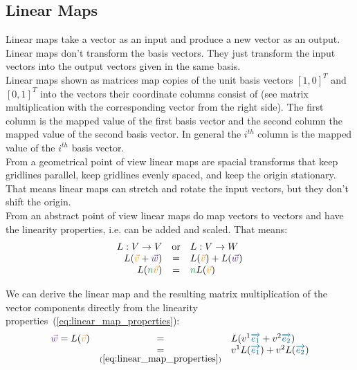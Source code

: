 \subsection{Linear Maps}

Linear maps take a vector as an input and produce a new vector as an output. Linear maps
don't transform the basis vectors. They just transform the input vectors into the output
vectors given in the same basis.\\

Linear maps shown as matrices map copies of the unit basis vectors $[1,0]^T$ and $[0,1]^T$
into the vectors their coordinate columns consist of (see matrix multiplication with the
corresponding vector from the right side). The first column is the mapped value of the
first basis vector and the second column the mapped value of the second basis vector. In
general the $i^{th}$ column is the mapped value of the $i^{th}$ basis vector.\\

From a geometrical point of view linear maps are spacial transforms that keep gridlines
parallel, keep gridlines evenly spaced, and keep the origin stationary. That means linear
maps can stretch and rotate the input vectors, but they don't shift the origin.\\

From an abstract point of view linear maps do map vectors to vectors and have the
linearity properties, i.e. can be added and scaled. That means:
\begin{equation}
    \label{eq:linear_map_properties}
    \begin{array}{rcl}
        L: V \rightarrow  V &\text{or}& L: V \rightarrow W \\
        L(\textcolor{YellowOrange}{\vec{v}} + \textcolor{RoyalPurple}{\vec{w}}) & = &
        L(\textcolor{YellowOrange}{\vec{v}}) + L(\textcolor{RoyalPurple}{\vec{w}}) \\
        L(\textcolor{ForestGreen}{n}\textcolor{YellowOrange}{\vec{v}}) & = &
        \textcolor{ForestGreen}{n}L(\textcolor{YellowOrange}{\vec{v}}) 
    \end{array}
\end{equation}

We can derive the linear map and the resulting matrix multiplication of the vector
components directly from the linearity properties~(\ref{eq:linear_map_properties}):
\begin{equation}
    \label{eq:linear_map_derive_matrix_multiplication}
    \begin{array}{rcl}
        \textcolor{RoyalPurple}{\vec{w}} = L(\textcolor{YellowOrange}{\vec{v}}) & = &
        L(\hdvc{1}\hdbv{1} + \hdvc{2}\hdbv{2}) \\
        & \underset{(\ref{eq:linear_map_properties})}{=} &
        \hdvc{1}L(\hdbv{1}) + \hdvc{2}L(\hdbv{2})
    \end{array}
\end{equation}

